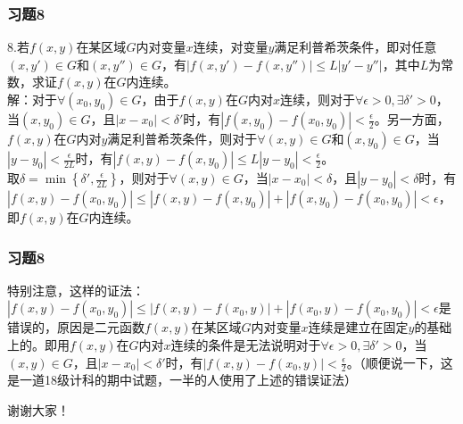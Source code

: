 \documentclass[xetex]{beamer}
\begin{document}
\begin{frame}
    \frametitle{习题8} 
   8.若$f(x,y)$在某区域$G$内对变量$x$连续，对变量$y$满足利普希茨条件，即对任意$(x,y')\in G$和$(x,y'')\in G$，有$|f(x,y')-f(x,y'')|\le L|y'-y''|$，其中$L$为常数，求证$f(x,y)$在$G$内连续。\\
	解：对于$\forall (x_{0},y_{0})\in G$，由于$f(x,y)$在$G$内对$x$连续，则对于$\forall \epsilon >0,\exists \delta'>0$，当$(x,y_{0})\in G$，且$|x-x_{0}|<\delta'$时，有$|f(x,y_{0})-f(x_{0},y_{0})|<\frac{\epsilon}{2}$。另一方面，$f(x,y)$在$G$内对$y$满足利普希茨条件，则对于$\forall (x,y)\in G$和$(x,y_{0})\in G$，当$|y-y_{0}|<\frac{\epsilon}{2L}$时，有$|f(x,y)-f(x,y_{0})|\le L|y-y_{0}|<\frac{\epsilon}{2}$。\\
取$\delta = \min\left\{\delta',\frac{\epsilon}{2L}\right\}$，则对于$\forall (x,y)\in G$，当$|x-x_{0}|<\delta$，且$|y-y_{0}|<\delta$时，有$|f(x,y)-f(x_{0},y_{0})|\le|f(x,y)-f(x,y_{0})|+|f(x,y_{0})-f(x_{0},y_{0})|<\epsilon$，即$f(x,y)$在$G$内连续。 
\end{frame}
\begin{frame}
    \frametitle{习题8} 
特别注意，这样的证法：\\$|f(x,y)-f(x_{0},y_{0})|\le|f(x,y)-f(x_{0},y)|+|f(x_{0},y)-f(x_{0},y_{0})|<\epsilon$是错误的，原因是二元函数$f(x,y)$在某区域$G$内对变量$x$连续是建立在固定$y$的基础上的。即用$f(x,y)$在$G$内对$x$连续的条件是无法说明对于$\forall \epsilon >0,\exists \delta'>0$，当$(x,y)\in G$，且$|x-x_{0}|<\delta'$时，有$|f(x,y)-f(x_{0},y)|<\frac{\epsilon}{2}$。（顺便说一下，这是一道18级计科的期中试题，一半的人使用了上述的错误证法）
\end{frame}
 

\begin{frame}[standout]
谢谢大家！
\end{frame}

 
\end{document}
